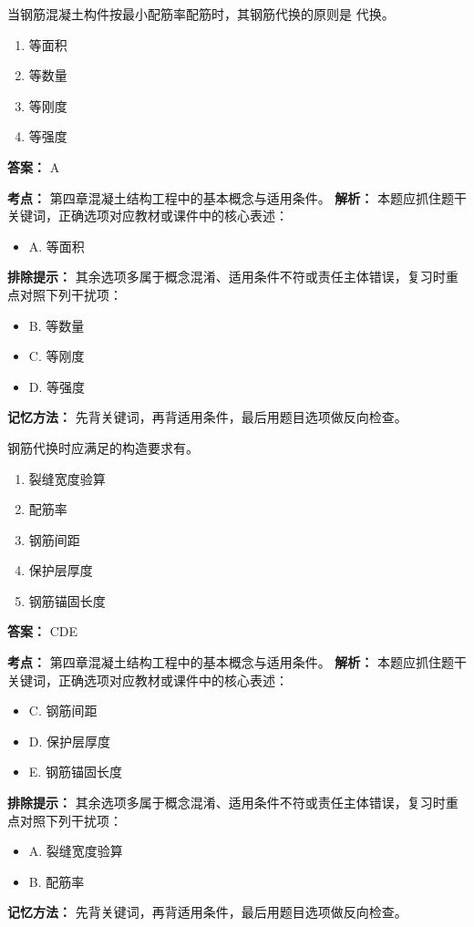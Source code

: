 \documentclass[UTF8,fontset=fandol,11pt]{ctexart}
\begin{document}
\begin{quizbox}[title={第 14 题}]
当钢筋混凝土构件按最小配筋率配筋时，其钢筋代换的原则是 代换。\\
\begin{enumerate}[label=\Alph*.]
\item 等面积
\item 等数量
\item 等刚度
\item 等强度
\end{enumerate}
\textbf{答案：} A
\vspace{0.25em}
\begin{answerbox}[title={考点解析}]
\textbf{考点：} 第四章混凝土结构工程中的基本概念与适用条件。
\textbf{解析：} 本题应抓住题干关键词，正确选项对应教材或课件中的核心表述：
\begin{itemize}
\item A. 等面积
\end{itemize}
\textbf{排除提示：} 其余选项多属于概念混淆、适用条件不符或责任主体错误，复习时重点对照下列干扰项：
\begin{itemize}
\item B. 等数量
\item C. 等刚度
\item D. 等强度
\end{itemize}
\textbf{记忆方法：} 先背关键词，再背适用条件，最后用题目选项做反向检查。
\end{answerbox}
\end{quizbox}

\begin{quizbox}[title={第 15 题}]
钢筋代换时应满足的构造要求有。\\
\begin{enumerate}[label=\Alph*.]
\item 裂缝宽度验算
\item 配筋率
\item 钢筋间距
\item 保护层厚度
\item 钢筋锚固长度
\end{enumerate}
\textbf{答案：} CDE
\vspace{0.25em}
\begin{answerbox}[title={考点解析}]
\textbf{考点：} 第四章混凝土结构工程中的基本概念与适用条件。
\textbf{解析：} 本题应抓住题干关键词，正确选项对应教材或课件中的核心表述：
\begin{itemize}
\item C. 钢筋间距
\item D. 保护层厚度
\item E. 钢筋锚固长度
\end{itemize}
\textbf{排除提示：} 其余选项多属于概念混淆、适用条件不符或责任主体错误，复习时重点对照下列干扰项：
\begin{itemize}
\item A. 裂缝宽度验算
\item B. 配筋率
\end{itemize}
\textbf{记忆方法：} 先背关键词，再背适用条件，最后用题目选项做反向检查。
\end{answerbox}
\end{quizbox}
\end{document}
